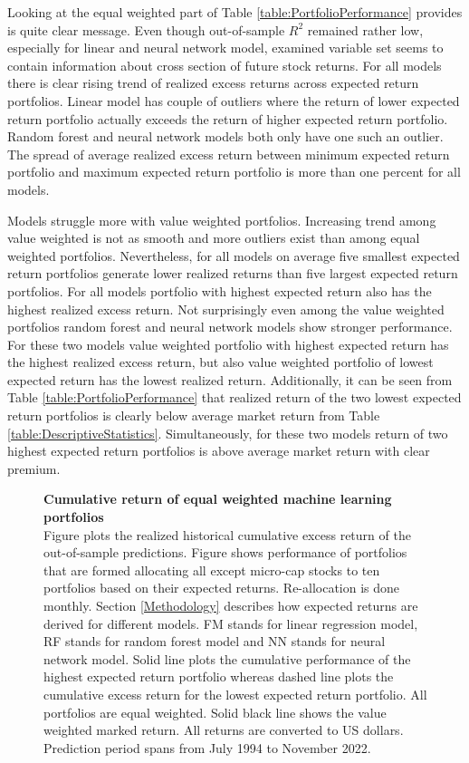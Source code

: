 \documentclass{article}
\begin{document}
Looking at the equal weighted part of Table \ref{table:PortfolioPerformance} provides is quite clear message. Even though out-of-sample $R^2$ remained rather low, especially for linear and neural network model, examined variable set seems to contain information about cross section of future stock returns. For all models there is clear rising trend of realized excess returns across expected return portfolios. Linear model has couple of outliers where the return of lower expected return portfolio actually exceeds the return of higher expected return portfolio. Random forest and neural network models both only have one such an outlier. The spread of average realized excess return between minimum expected return portfolio and maximum expected return portfolio is more than one percent for all models.  \par

Models struggle more with value weighted portfolios. Increasing trend among value weighted is not as smooth and more outliers exist than among equal weighted portfolios. Nevertheless, for all models on average five smallest expected return portfolios generate lower realized returns than five largest expected return portfolios. For all models portfolio with highest expected return also has the highest realized excess return. Not surprisingly even among the value weighted portfolios random forest and neural network models show stronger performance. For these two models value weighted portfolio with highest expected return has the highest realized excess return, but also value weighted portfolio of lowest expected return has the lowest realized return. Additionally, it can be seen from Table \ref{table:PortfolioPerformance} that realized return of the two lowest expected return portfolios is clearly below average market return from Table \ref{table:DescriptiveStatistics}. Simultaneously, for these two models return of two highest expected return portfolios is above average market return with clear premium. \par

\begin{figure}[ht]
\centering
\caption[Cumulative return of equal weighted machine learning portfolios]{\textbf{Cumulative return of equal weighted machine learning portfolios}\\ Figure plots the realized historical cumulative excess return of the out-of-sample predictions. Figure shows performance of portfolios that are formed allocating all except micro-cap stocks to ten portfolios based on their expected returns. Re-allocation is done monthly. Section \ref{Methodology} describes how expected returns are derived for different models. FM stands for linear regression model, RF stands for random forest model and NN stands for neural network model. Solid line plots the cumulative performance of the highest expected return portfolio whereas dashed line plots the cumulative excess return for the lowest expected return portfolio. All portfolios are equal weighted. Solid black line shows the value weighted marked return. All returns are converted to US dollars. Prediction period spans from July 1994 to November 2022.}

\label{plot:cumul_ew_portf_return}
\end{figure}
\end{document}
